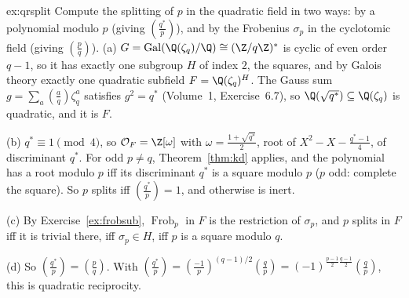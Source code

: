 \begin{solution}{ex:qrsplit}
\idea Compute the splitting of $p$ in the quadratic field in two ways: by a polynomial modulo $p$ (giving
$\left(\frac{q^*}p\right)$), and by the Frobenius $\sigma_p$ in the cyclotomic field (giving $\left(\frac pq\right)$).
\writeup (a) $G=\operatorname{Gal}(\Q(\zeta_q)/\Q)\cong(\Z/q\Z)^*$ is cyclic of even order $q-1$, so it has exactly one
subgroup $H$ of index $2$, the squares, and by Galois theory exactly one quadratic subfield $F=\Q(\zeta_q)^H$. The Gauss
sum $g=\sum_a\left(\frac aq\right)\zeta_q^a$ satisfies $g^2=q^*$ (Volume~1, Exercise~6.7), so $\Q(\sqrt{q^*})\subseteq
\Q(\zeta_q)$ is quadratic, and it is $F$.

(b) $q^*\equiv1\pmod 4$, so $\mathcal O_F=\Z[\omega]$ with $\omega=\frac{1+\sqrt{q^*}}2$, root of $X^2-X-\frac{q^*-1}4$, of
discriminant $q^*$. For odd $p\ne q$, Theorem~\ref{thm:kd} applies, and the polynomial has a root modulo $p$ iff its
discriminant $q^*$ is a square modulo $p$ ($p$ odd: complete the square). So $p$ splits iff $\left(\frac{q^*}p\right)=1$,
and otherwise is inert.

(c) By Exercise~\ref{ex:frobsub}, $\operatorname{Frob}_p$ in $F$ is the restriction of $\sigma_p$, and $p$ splits in $F$
iff it is trivial there, iff $\sigma_p\in H$, iff $p$ is a square modulo $q$.

(d) So $\left(\frac{q^*}p\right)=\left(\frac pq\right)$. With $\left(\frac{q^*}p\right)=\left(\frac{-1}p\right)^{(q-1)/2}
\left(\frac qp\right)=(-1)^{\frac{p-1}2\frac{q-1}2}\left(\frac qp\right)$, this is quadratic reciprocity.
\end{solution}

